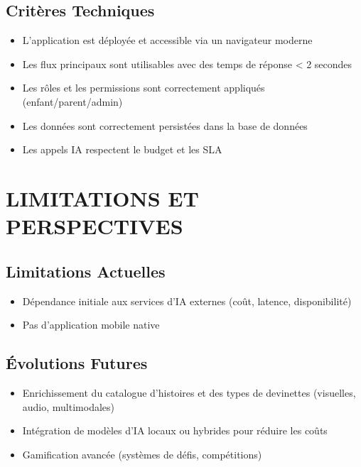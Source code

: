 \documentclass[12pt,a4paper]{article}
\begin{document}
\subsection{Critères Techniques}

\begin{itemize}
    \item L'application est déployée et accessible via un navigateur moderne
    \item Les flux principaux sont utilisables avec des temps de réponse < 2 secondes
    \item Les rôles et les permissions sont correctement appliqués (enfant/parent/admin)
    \item Les données sont correctement persistées dans la base de données
    \item Les appels IA respectent le budget et les SLA
\end{itemize}

\section{LIMITATIONS ET PERSPECTIVES}

\subsection{Limitations Actuelles}

\begin{itemize}
    \item Dépendance initiale aux services d'IA externes (coût, latence, disponibilité)
    \item Pas d'application mobile native
\end{itemize}

\subsection{Évolutions Futures}

\begin{itemize}
    \item Enrichissement du catalogue d'histoires et des types de devinettes (visuelles, audio, multimodales)
    \item Intégration de modèles d'IA locaux ou hybrides pour réduire les coûts
    \item Gamification avancée (systèmes de défis, compétitions)
\end{itemize}

\newpage
\end{document}
